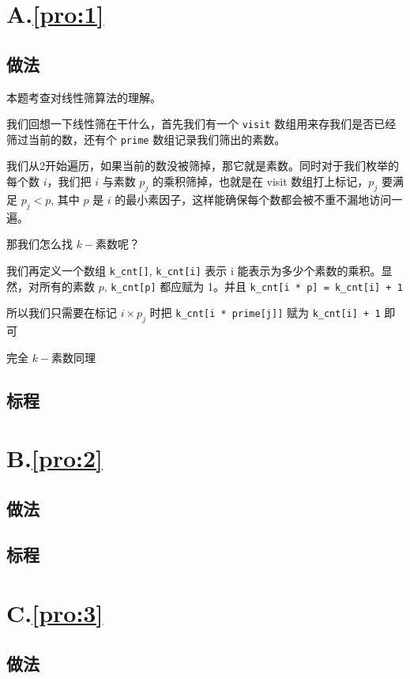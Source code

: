 \documentclass[
	lang=cn,
	color=blue
]{elegantbook}
\begin{document}
\chapter*{A.\quad \ref*{pro:1}}
\section*{做法}

本题考查对线性筛算法的理解。

我们回想一下线性筛在干什么，首先我们有一个 \verb|visit| 数组用来存我们是否已经筛过当前的数，还有个 \verb|prime| 数组记录我们筛出的素数。

我们从2开始遍历，如果当前的数没被筛掉，那它就是素数。同时对于我们枚举的每个数 $i$，我们把 $i$ 与素数 $p_j$ 的乘积筛掉，也就是在 visit 数组打上标记，$p_j$ 要满足 $p_j<p$, 其中 $p$ 是 $i$ 的最小素因子，这样能确保每个数都会被不重不漏地访问一遍。

那我们怎么找 $k-$素数呢？

我们再定义一个数组 \verb|k_cnt[]|, \verb|k_cnt[i]| 表示 i 能表示为多少个素数的乘积。显然，对所有的素数 $p$, \verb|k_cnt[p]| 都应赋为 1。并且 \verb|k_cnt[i * p] = k_cnt[i] + 1|

所以我们只需要在标记 $i\times p_j$ 时把 \verb|k_cnt[i * prime[j]]| 赋为 \verb|k_cnt[i] + 1| 即可

完全 $k-$素数同理

\section*{标程}

\chapter*{B.\quad \ref*{pro:2}}
\section*{做法}

\section*{标程}

\chapter*{C.\quad \ref*{pro:3}}
\section*{做法}
\end{document}
